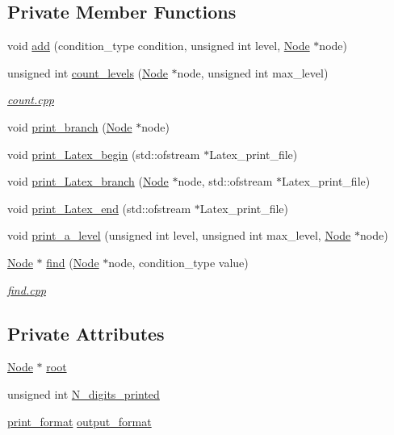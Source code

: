 \subsection*{Private Member Functions}
\begin{DoxyCompactItemize}
\item 
void \hyperlink{class_tree_aef29a87ebfb47bc1bb5cacff763d0c0d}{add} (condition\+\_\+type condition, unsigned int level, \hyperlink{struct_node}{Node} $\ast$node)
\item 
unsigned int \hyperlink{class_tree_afd369a246a682e225beb2d2c1c5e8c5a}{count\+\_\+levels} (\hyperlink{struct_node}{Node} $\ast$node, unsigned int max\+\_\+level)
\begin{DoxyCompactList}\small\item\em \hyperlink{count_8cpp}{count.\+cpp} \end{DoxyCompactList}\item 
void \hyperlink{class_tree_a2fb927c8da9d55f28039b407b101ac28}{print\+\_\+branch} (\hyperlink{struct_node}{Node} $\ast$node)
\item 
void \hyperlink{class_tree_a5ff830823b2d44e86b61e4f882de3b6a}{print\+\_\+\+Latex\+\_\+begin} (std\+::ofstream $\ast$Latex\+\_\+print\+\_\+file)
\item 
void \hyperlink{class_tree_a761b5da2456ff63fe51105c79135c903}{print\+\_\+\+Latex\+\_\+branch} (\hyperlink{struct_node}{Node} $\ast$node, std\+::ofstream $\ast$Latex\+\_\+print\+\_\+file)
\item 
void \hyperlink{class_tree_a7ea34e54ff7824c3d24ce72dcb4fdbf4}{print\+\_\+\+Latex\+\_\+end} (std\+::ofstream $\ast$Latex\+\_\+print\+\_\+file)
\item 
void \hyperlink{class_tree_a5d7f439dbf62845d33ed604b88260332}{print\+\_\+a\+\_\+level} (unsigned int level, unsigned int max\+\_\+level, \hyperlink{struct_node}{Node} $\ast$node)
\item 
\hyperlink{struct_node}{Node} $\ast$ \hyperlink{class_tree_ac539645ded3041f4142b8cb0a8a1c0b8}{find} (\hyperlink{struct_node}{Node} $\ast$node, condition\+\_\+type value)
\begin{DoxyCompactList}\small\item\em \hyperlink{find_8cpp}{find.\+cpp} \end{DoxyCompactList}\end{DoxyCompactItemize}
\subsection*{Private Attributes}
\begin{DoxyCompactItemize}
\item 
\hyperlink{struct_node}{Node} $\ast$ \hyperlink{class_tree_ae1cb548295b2e451164d89b16ac72d17}{root}
\item 
unsigned int \hyperlink{class_tree_ad24ef7cae6a7c0226280cf56bbc25f53}{N\+\_\+digits\+\_\+printed}
\item 
\hyperlink{_tree_8hpp_a73f5f76e6617ce240bad0b57b80be996}{print\+\_\+format} \hyperlink{class_tree_aeaf14b04be7b3de8214fcc5c1545ebde}{output\+\_\+format}
\end{DoxyCompactItemize}



